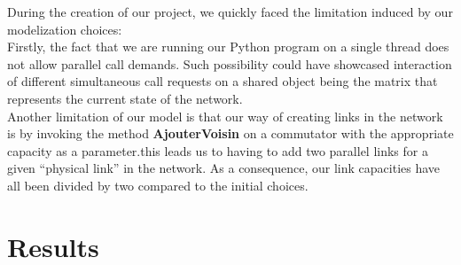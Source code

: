 \documentclass[lettersize,journal]{IEEEtran} %
\begin{document}
During the creation of our project, we quickly faced the limitation induced by our modelization choices:\\
Firstly, the fact that we are running our Python program on a single thread does not allow parallel call demands. Such possibility
could have showcased interaction of different simultaneous call requests on a shared object being the matrix that represents the current
state of the network.\\
Another limitation of our model is that our way of creating links in the network is by invoking the method \textbf{AjouterVoisin} on 
a commutator with the appropriate capacity as a parameter.this leads us to having to add two parallel links for a given ``physical link''
in the network. As a consequence, our link capacities have all been divided by two compared to the initial choices.
\section{Results}
\end{document}
